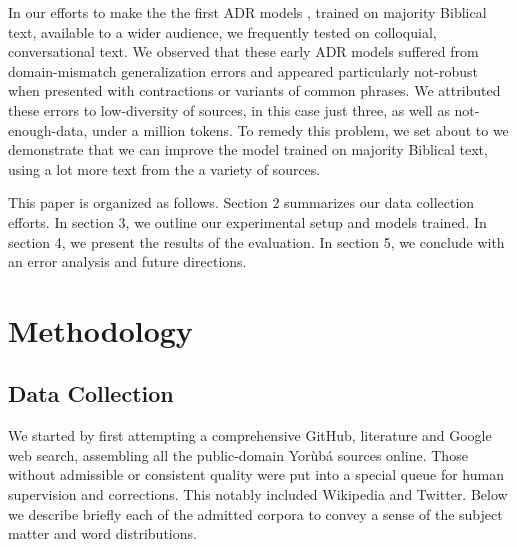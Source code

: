 \documentclass{article} %
\begin{document}
In our efforts to make the the first ADR models \citep{orife2018adr}, trained on majority Biblical text, available to a wider audience, we frequently tested on colloquial, conversational text. We observed that these early ADR models suffered from domain-mismatch generalization errors and appeared particularly not-robust when presented with contractions or variants of common phrases. We attributed these errors to low-diversity of sources, in this case just three, as well as not-enough-data, under a million tokens. To remedy this problem,  we set about to  we demonstrate that we can improve the model trained on majority Biblical text, using a lot more text from the a variety of sources.

This paper is organized as follows. Section 2 summarizes our data collection efforts. In section 3, we outline our experimental setup and models trained. In section 4, we present the results of the evaluation. In section 5, we conclude with an error analysis and future directions.

\section{Methodology}\label{sec:methods}

\subsection{Data Collection}\label{sec:collection}

We started by first attempting a comprehensive GitHub, literature and Google web search, assembling all the public-domain Yor{\`u}b{\'a} sources online. Those without admissible or consistent quality were put into a special queue for human supervision and corrections. This notably included Wikipedia and Twitter. Below we describe briefly each of the admitted corpora to convey a sense of the subject matter and word distributions. 
\end{document}
